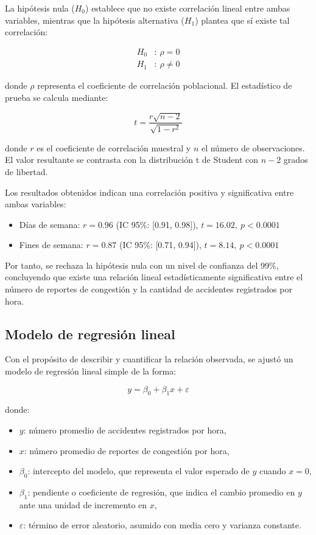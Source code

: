 \documentclass[12pt]{article}
\begin{document}
La hipótesis nula ($H_0$) establece que no existe correlación lineal entre ambas variables, mientras que la hipótesis alternativa ($H_1$) plantea que sí existe tal correlación:

\begin{align}
H_0&:\ \rho = 0 \\
H_1&:\ \rho \ne 0
\end{align}

donde $\rho$ representa el coeficiente de correlación poblacional.
El estadístico de prueba se calcula mediante:

\begin{equation}
t = \frac{r \sqrt{n - 2}}{\sqrt{1 - r^2}}
\end{equation}

donde $r$ es el coeficiente de correlación muestral y $n$ el número de observaciones.
El valor resultante se contrasta con la distribución t de Student con $n - 2$ grados de libertad.

Los resultados obtenidos indican una correlación positiva y significativa entre ambas variables:
\begin{itemize}
    \item Días de semana: \( r = 0.96 \) (IC 95\%: [0.91, 0.98]), \(t = 16.02,\ p < 0.0001\)
    \item Fines de semana: \( r = 0.87 \) (IC 95\%: [0.71, 0.94]), \(t = 8.14,\ p < 0.0001\)
\end{itemize}

Por tanto, se rechaza la hipótesis nula con un nivel de confianza del 99\%, concluyendo que existe una relación lineal estadísticamente significativa entre el número de reportes de congestión y la cantidad de accidentes registrados por hora.

\vspace{0.5cm}

\subsection{Modelo de regresión lineal}

Con el propósito de describir y cuantificar la relación observada, se ajustó un modelo de regresión lineal simple de la forma:

\begin{equation}
y = \beta_0 + \beta_1 x + \varepsilon
\end{equation}

donde:
\begin{itemize}
    \item \(y\): número promedio de accidentes registrados por hora,
    \item \(x\): número promedio de reportes de congestión por hora,
    \item \(\beta_0\): intercepto del modelo, que representa el valor esperado de \(y\) cuando \(x = 0\),
    \item \(\beta_1\): pendiente o coeficiente de regresión, que indica el cambio promedio en \(y\) ante una unidad de incremento en \(x\),
    \item \(\varepsilon\): término de error aleatorio, asumido con media cero y varianza constante.
\end{itemize}
\end{document}
